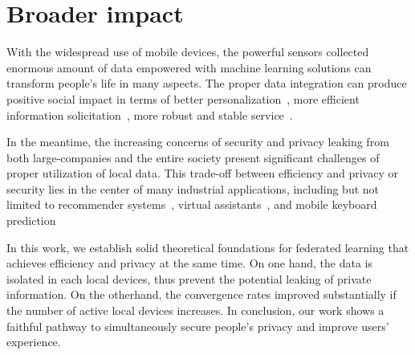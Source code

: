 
\section{Broader impact}
With the widespread use of mobile devices, the powerful sensors
collected enormous amount of data empowered with machine learning
solutions can transform people's life in many aspects. The proper
data integration can produce positive social
impact in terms of better personalization~\cite{fallah2020personalized}, more efficient information solicitation~\cite{chen2018federated}, more robust and stable service~\cite{47586}.

In the meantime, the increasing concerns of security and
privacy leaking from both large-companies and the entire society
present significant challenges of proper utilization of local
data. This trade-off between efficiency and privacy or security
lies in the center of many industrial applications, including 
but not limited to recommender systems~\cite{chen2018federated}, virtual assistants~\cite{lamautonomy}, and mobile keyboard prediction~\cite{47586}

In this work, we establish solid theoretical foundations for federated
learning that achieves efficiency and privacy at the same time. 
On one hand, the data is isolated in each local devices, thus prevent
the potential leaking of private information. On the otherhand, the
convergence rates improved substantially if the number of
active local devices increases. In conclusion, our work 
shows a faithful pathway to simultaneously secure people's privacy and improve
users' experience.




